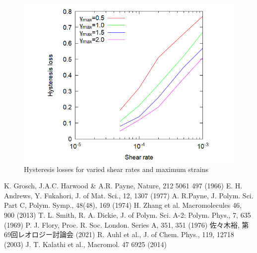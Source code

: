 \documentclass[uplatex,dvipdfmx,a4paper,11pt]{jsarticle}
\begin{document}
\begin{figure}[hb]
\begin{minipage}{0.34\hsize}
\begin{center}
        \label{fig:hyst}
	\end{center}
\end{minipage}
\begin{minipage}{0.32\hsize}
	\begin{center}
        \includegraphics[width=\textwidth]{hyst_shear.png}
        \caption{Hysteresis losses for varied shear rates and maximum strains}
        \label{fig:hystloss}
	\end{center}
\end{minipage}
\end{figure}

\vspace{-1mm}

% 
% 

\begin{thebibliography}{99}
     K. Grosch, J.A.C. Harwood \& A.R. Payne, Nature, 212 5061 497 (1966)
     E. H. Andrews, Y. Fukahori, J. of Mat. Sci., 12, 1307 (1977)
     A. R.Payne, J. Polym. Sci. Part C, Polym. Symp., 48(48), 169 (1974)
     H. Zhang et al. Macromolecules 46, 900 (2013)
     T. L. Smith, R. A. Dickie, J. of Polym. Sci. A-2: Polym. Phys., 7, 635 (1969)
     P. J. Flory, Proc. R. Soc. London. Series A, 351, 351 (1976)
     佐々木裕, 第69回レオロジー討論会 (2021)
     R. Auhl et al., J. of Chem. Phys., 119, 12718 (2003)
     J. T. Kalathi et al., Macromol. 47 6925 (2014)
\end{thebibliography}
\end{document}
